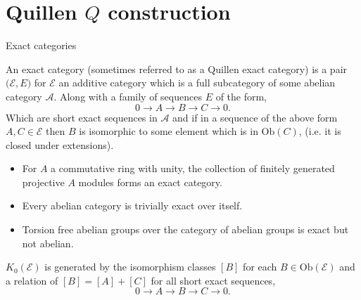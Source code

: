 \documentclass[10pt]{beamer}
\begin{document}
\section{Quillen \( Q \) construction}
\begin{frame}{Exact categories}
	\begin{definition}\label{defexactcat}
		An exact category (sometimes referred to as a Quillen exact category) is a pair $\mathcal{(E},E)$ for $\mathcal{E}$ an additive category which is a full subcategory of some abelian category $\mathcal{A}$. Along with a family of sequences $E$ of the form, \[ 0 \to A \to B \to C \to 0. \] Which are short exact sequences in $\mathcal{A}$ and if in a sequence of the above form $A, C \in \mathcal{E}$ then $B $ is isomorphic to some element which is in $\mathrm{Ob}(C)$, (i.e. it is closed under extensions).
	\end{definition}
	\pagebreak
	\begin{example}
		\begin{itemize}
			\item 	For \(A\) a commutative ring with unity, the collection of finitely generated projective \( A \) modules forms an exact category. 
			\item Every abelian category is trivially exact over itself.
			\item Torsion free abelian groups over the category of abelian groups is exact but not abelian.
		\end{itemize}
	\end{example}
	\pagebreak
	
	\begin{definition}\label{def:k0exact}
		$K_0(\mathcal E)$ is generated by the isomorphism classes $[B]$ for each $B \in \mathrm{Ob}(\mathcal{E})$ and a relation of $[B]=[A]+[C]$ for all short exact sequences, \[ 0 \to A \to B \to C \to 0.\]
	\end{definition}
\end{frame}
\end{document}
